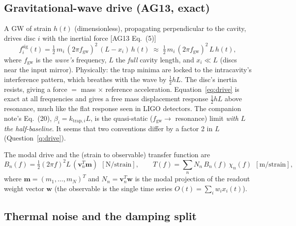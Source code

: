\documentclass[11pt]{article}
\begin{document}
\subsection{Gravitational-wave drive (AG13, exact)}

A GW of strain $h(t)$ (dimensionless), propagating perpendicular to the
cavity, drives disc $i$ with the inertial force [AG13 Eq.~(5)]
\begin{equation}
  f^{\mathrm{sig}}_i(t) = \tfrac{1}{2}\, m_i\,(2\pi f_{\mathrm{gw}})^2\,
  (L - x_i)\, h(t)
  \;\approx\; \tfrac{1}{2}\, m_i\,(2\pi f_{\mathrm{gw}})^2\, L\, h(t),
  \label{eq:drive}
\end{equation}
where $f_{\mathrm{gw}}$ is the \emph{wave's} frequency, $L$ the
\emph{full} cavity length, and $x_i \ll L$ (discs near the input
mirror). Physically: the trap minima are locked to the intracavity's
interference pattern, which breathes with the wave by $\frac12 hL$. The
disc's inertia resists, giving a force $=$ mass $\times$ reference
acceleration. Equation~\eqref{eq:drive} is exact at all frequencies and
gives a free mass displacement response $\frac12 hL$
above resonance, much like the flat response seen in LIGO detectors. 
The companion note's Eq.~(20), $\beta_i =
k_{\mathrm{trap},i}L$, is the quasi-static ($f_{\mathrm{gw}}\!\to\!$
resonance) limit \emph{with $L$ the half-baseline}. It seems that
two conventions differ by a factor 2 in $L$ (Question~\ref{q:drive}).

The modal drive and the (strain to observable) transfer function
are
\begin{equation}
  B_n(f) = \tfrac{1}{2}(2\pi f)^2 L\,(\mathbf{v}_n^T\mathbf{m})
  \ \ [\mathrm{N/strain}], \qquad
  T(f) = \sum_{n} N_n\, B_n(f)\, \chi_n(f) \ \ [\mathrm{m/strain}],
  \label{eq:transfer}
\end{equation}
where $\mathbf{m}=(m_1,\dots,m_N)^T$ and $N_n =
\mathbf{v}_n^T\mathbf{w}$ is the modal projection of the readout weight
vector $\mathbf{w}$ (the observable is the single time series $O(t) =
\sum_i w_i x_i(t)$).

\subsection{Thermal noise and the damping split}
\label{sec:damping}
\end{document}
